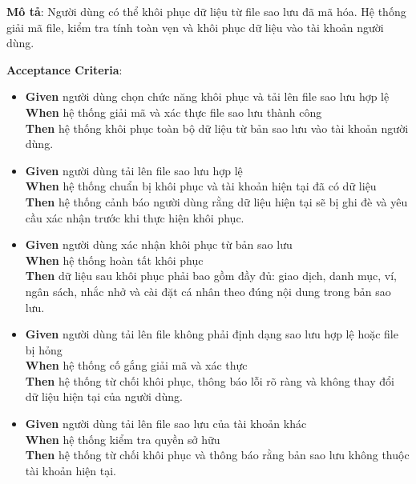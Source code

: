 \textbf{Mô tả}: Người dùng có thể khôi phục dữ liệu từ file sao lưu đã mã hóa. Hệ thống giải mã file, kiểm tra tính toàn vẹn và khôi phục dữ liệu vào tài khoản người dùng.



\textbf{Acceptance Criteria}:

\begin{itemize}
\item \textbf{Given} người dùng chọn chức năng khôi phục và tải lên file sao lưu hợp lệ  \\ \hspace*{1.5em}  \textbf{When} hệ thống giải mã và xác thực file sao lưu thành công  \\ \hspace*{1.5em}  \textbf{Then} hệ thống khôi phục toàn bộ dữ liệu từ bản sao lưu vào tài khoản người dùng.
\item \textbf{Given} người dùng tải lên file sao lưu hợp lệ  \\ \hspace*{1.5em}  \textbf{When} hệ thống chuẩn bị khôi phục và tài khoản hiện tại đã có dữ liệu  \\ \hspace*{1.5em}  \textbf{Then} hệ thống cảnh báo người dùng rằng dữ liệu hiện tại sẽ bị ghi đè và yêu cầu xác nhận trước khi thực hiện khôi phục.
\item \textbf{Given} người dùng xác nhận khôi phục từ bản sao lưu  \\ \hspace*{1.5em}  \textbf{When} hệ thống hoàn tất khôi phục  \\ \hspace*{1.5em}  \textbf{Then} dữ liệu sau khôi phục phải bao gồm đầy đủ: giao dịch, danh mục, ví, ngân sách, nhắc nhở và cài đặt cá nhân theo đúng nội dung trong bản sao lưu.
\item \textbf{Given} người dùng tải lên file không phải định dạng sao lưu hợp lệ hoặc file bị hỏng  \\ \hspace*{1.5em}  \textbf{When} hệ thống cố gắng giải mã và xác thực  \\ \hspace*{1.5em}  \textbf{Then} hệ thống từ chối khôi phục, thông báo lỗi rõ ràng và không thay đổi dữ liệu hiện tại của người dùng.
\item \textbf{Given} người dùng tải lên file sao lưu của tài khoản khác  \\ \hspace*{1.5em}  \textbf{When} hệ thống kiểm tra quyền sở hữu  \\ \hspace*{1.5em}  \textbf{Then} hệ thống từ chối khôi phục và thông báo rằng bản sao lưu không thuộc tài khoản hiện tại.

\end{itemize}
